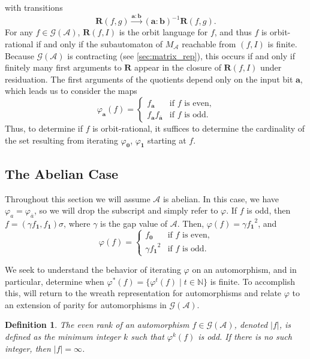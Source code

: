 \documentclass[12pt, letterpaper]{article}
\newcommand{\N}{\mathbb N}
\newcommand{\A}{\mathcal A}
\newcommand{\ch}[1]{\mathbf{#1}}
\newcommand{\res}[2]{{{#1}_{\ch{#2}}}}
\newcommand{\gp}{\mathcal G}
\newcommand{\R}{\mathbf R}
\newcommand{\f}[1]{\overline{#1}}
\newcommand{\rk}[1]{\left|#1\right|}
\newtheorem{defn}[thm]{Definition}
\begin{document}
with transitions
\[
    \R(f, g) \xrightarrow{\ch{a} {:} \ch{b}} (\ch{a} {:} \ch{b})^{-1} \R(f,g).
\]
For any $f \in \gp(\A)$, $\R(f, I)$ is the orbit language for $f$, and thus $f$
is orbit-rational if and only if the subautomaton of $M_\A$ reachable from $(f,
I)$ is finite. Because $\gp(\A)$ is contracting (see \cref{sec:matrix_rep}),
this occurs if and only if finitely many first arguments to $\R$ appear in the
closure of $\R(f, I)$ under residuation. The first arguments of the quotients
depend only on the input bit $\ch{a}$, which leads us to consider the maps
\[
    \varphi_{\ch{a}}(f) = \begin{cases}
        \res{f}{a} & \text{if $f$ is even,}\\
        \res{f}{a}\res{f}{\f{a}} & \text{if $f$ is odd.}
    \end{cases}
\]
Thus, to determine if $f$ is orbit-rational, it suffices to determine the
cardinality of the set resulting from iterating $\varphi_{\ch{0}}$,
$\varphi_{\ch{1}}$ starting at $f$.


\subsection{The Abelian Case}\label{sec:abelian-orbit}
Throughout this section we will assume $\A$ is abelian. In this case, we have
$\varphi_a = \varphi_{\f{a}}$, so we will drop the subscript and simply refer
to $\varphi$. If $f$ is odd, then $f = (\gamma \res{f}{1}, \res{f}{1}) \sigma$,
where $\gamma$ is the gap value of $\A$.  Then, $\varphi(f) = \gamma
\res{f}{1}^2$, and
\begin{equation}\label{eq:abelianorbitresid}
    \varphi(f) = \begin{cases}
        \res{f}{0} & \text{if $f$ is even,}\\
        \gamma \res{f}{1}^2 & \text{if $f$ is odd.}
    \end{cases}
\end{equation}

We seek to understand the behavior of iterating $\varphi$ on an automorphism,
and in particular, determine when $\varphi^*(f) = \{\varphi^t (f) \mid t \in
\N\}$ is finite.  To accomplish this, will return to the wreath representation
for automorphisms and relate $\varphi$ to an extension of parity for
automorphisms in $\gp(\A)$.

\begin{defn}
    The even rank of an automorphism $f \in \gp(\A)$, denoted $\rk{f}$, is
    defined as the minimum integer $k$ such that $\varphi^k(f)$ is odd. If
    there is no such integer, then $\rk{f} = \infty$.
\end{defn}
\end{document}
